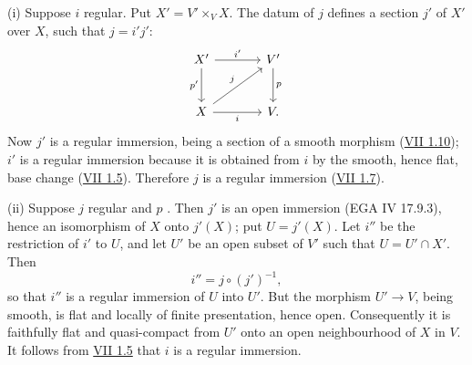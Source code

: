 (i) Suppose $i$ regular. Put $X'=V'\times_V X$. The datum of $j$ defines a section $j'$ of $X'$ over $X$, such that $j=i'j'$:
\[
\begin{tikzcd}[column sep=large,row sep=large]
X' \arrow[r,"i'"] \arrow[d,"p'"'] & V' \arrow[d,"p"]\\
X \arrow[r,"i"'] \arrow[ur,"j"] & V .
\end{tikzcd}
\]
Now $j'$ is a regular immersion, being a section of a smooth morphism (\hyperlink{sga6.e07.prop.1-10}{VII 1.10}); $i'$ is a regular immersion because it is obtained from $i$ by the smooth, hence flat, base change (\hyperlink{sga6.e07.prop.1-5}{VII 1.5}). Therefore $j$ is a regular immersion (\hyperlink{sga6.e07.prop.1-7}{VII 1.7}).

(ii) Suppose $j$ regular and $p$ \etale. Then $j'$ is an open immersion (EGA IV 17.9.3), hence an isomorphism of $X$ onto $j'(X)$; put $U=j'(X)$. Let $i''$ be the restriction of $i'$ to $U$, and let $U'$ be an open subset of $V'$ such that $U=U'\cap X'$. Then
\[
i''=j\circ(j')^{-1},
\]
so that $i''$ is a regular immersion of $U$ into $U'$. But the morphism $U'\to V$, being smooth, is flat and locally of finite presentation, hence open. Consequently it is faithfully flat and quasi-compact from $U'$ onto an open neighbourhood of $X$ in $V$. It follows from \hyperlink{sga6.e07.prop.1-5}{VII 1.5} that $i$ is a regular immersion.

